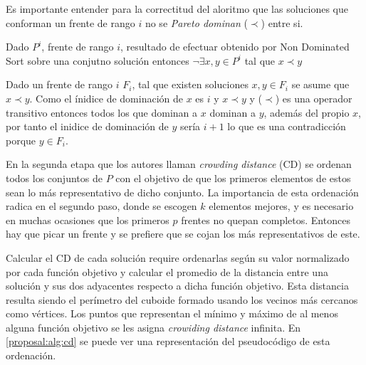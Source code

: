 Es importante entender para la correctitud del aloritmo  que las soluciones que conforman un frente de rango $i$ no se \textit{Pareto dominan} ($\prec$) entre si.
\begin{theorem}
Dado $P^i$, frente de rango $i$, resultado de efectuar obtenido por Non Dominated Sort sobre una conjutno soluci\'on entonces $\neg \exists x, y \in P^i$ tal que $x \prec y$
\end{theorem}
Dado un frente de rango $i$ $F_i$, tal que existen soluciones $x, y \in F_i$ se asume que $x \prec y$. Como el \'inidice de dominaci\'on de $x$ es $i$ y $x \prec y$ y ($\prec$) es una operador transitivo entonces todos los que dominan a $x$ dominan a $y$, adem\'as del propio $x$, por tanto el inidice de dominaci\'on de $y$ ser\'ia $i+1$ lo que es una contradicci\'on porque $y \in F_i$. 

En la segunda etapa que los autores llaman \textit{crowding distance} (CD) se ordenan todos los conjuntos de $P$ con el objetivo de que los primeros elementos de estos sean lo m\'as representativo de dicho conjunto. La importancia de esta ordenaci\'on radica en el segundo paso, donde se escogen $k$ elementos mejores, y es necesario en muchas ocasiones que los primeros $p$ frentes no quepan completos. Entonces hay que picar un frente y se prefiere que se cojan los m\'as representativos de este.


Calcular el CD de cada soluci\'on require ordenarlas seg\'un su valor normalizado por cada funci\'on objetivo y calcular el promedio de la distancia entre una soluci\'on y sus dos adyacentes respecto a dicha funci\'on objetivo. Esta distancia resulta siendo el per\'imetro del cuboide formado usando los vecinos m\'as cercanos como v\'ertices. Los puntos que representan el m\'inimo y m\'aximo de al menos alguna funci\'on objetivo se les asigna \textit{crowiding distance} infinita. En \ref{proposal:alg:cd} se puede ver una representaci\'on del pseudoc\'odigo de esta ordenaci\'on.

